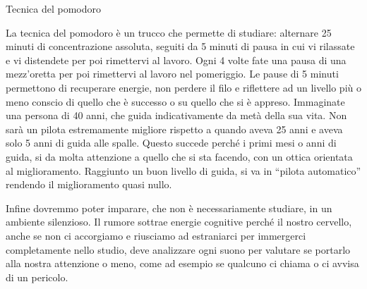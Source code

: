 \documentclass[12pt]{book} %
\begin{document}
\begin{mdframed}[linewidth=1pt]
Tecnica del pomodoro

La tecnica del pomodoro è un trucco che permette di studiare: alternare 25 minuti di concentrazione assoluta, seguiti da
5 minuti di pausa in cui vi rilassate e vi distendete per poi rimettervi al lavoro. Ogni 4 volte fate una pausa di una
mezz'oretta per poi rimettervi al lavoro nel pomeriggio. Le pause di 5 minuti permettono di
recuperare energie, non perdere il filo e riflettere ad un livello più o meno conscio di quello che è successo o su
quello che si è appreso. Immaginate
una persona di 40 anni, che guida indicativamente da metà della sua vita. Non sarà un pilota estremamente migliore
rispetto a quando aveva 25 anni e aveva solo 5 anni di guida alle spalle. Questo succede perché i primi mesi o anni di
guida, si da molta attenzione a quello che si sta facendo, con un ottica orientata al miglioramento. Raggiunto un buon
livello di guida, si va in “pilota automatico” rendendo il miglioramento quasi nullo.

Infine dovremmo poter imparare, che non è necessariamente studiare, in un ambiente silenzioso. Il rumore sottrae energie
cognitive perché il nostro cervello, anche se non ci accorgiamo e riusciamo ad estraniarci per immergerci completamente
nello studio, deve analizzare ogni suono per valutare se portarlo alla nostra attenzione o meno, come ad esempio se
qualcuno ci chiama o ci avvisa di un pericolo.
\end{mdframed}
\end{document}
